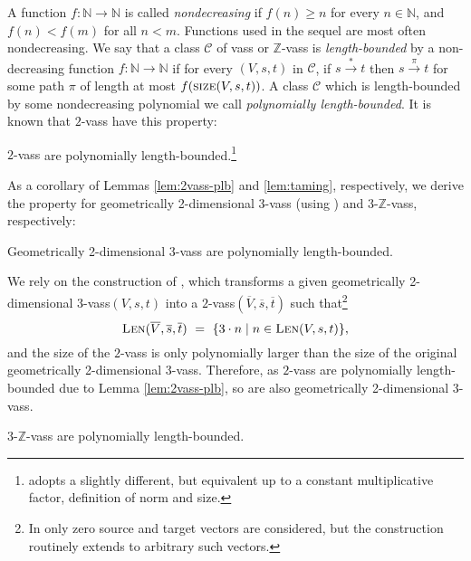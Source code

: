 \documentclass[a4paper, UKenglish, cleveref, autoref, thm-restate]{lipics-v2021}
\newcommand{\C}{\mathcal{C}}
\newcommand{\N}{\mathbb{N}}
\newcommand{\Z}{\mathbb{Z}}
\newcommand{\trans}[1]{\stackrel{#1}{\longrightarrow}}
\newcommand{\tran}{\trans{*}}
\newcommand{\size}{\textsc{size}}
\newcommand{\lb}{length-bounded\xspace}
\newcommand{\plb}{polynomially length-bounded\xspace}
\newcommand{\Len}[3]{\textsc{Len}(#1, #2, #3)}
\newcommand{\vass}{{\sc vass}\xspace}
\newcommand{\zvass}{$\Z$-{\sc vass}\xspace}
\newcommand{\dvass}{\parvass 2}
\newcommand{\tvass}{\parvass 3}
\newcommand{\geomvass}{geometrically 2-dimensional \tvass}
\newcommand{\Geomvass}{Geometrically 2-dimensional \tvass}
\newcommand{\tzvass}{\parzvass 3}
\newcommand{\parvass}[1]{{$#1$-\vass}\xspace}
\newcommand{\parzvass}[1]{{$#1$-$\Z$-\vass}\xspace}
\renewcommand{\C}{\mathcal{C}}
\newcommand{\essdvass}[1]{\overline{#1}}
\begin{document}
A function $f:\N\to\N$ is called \emph{nondecreasing} if $f(n) \geq n$ for every $n \in \N$,
and $f(n)< f(m)$ for all $n<m$.
Functions used in the sequel are most often nondecreasing.
We say that a class $\C$ of \vass or \zvass is \emph{\lb} by a 
non-decreasing function $f:\N\to\N$ if 
for every $(V, s, t)$ in $\C$, if $s \tran t$ then 
$s \trans{\pi} t$ for some path $\pi$ of length at most $f(\size(V, s, t))$.
A class $\C$ which is \lb  by some nondecreasing
polynomial we call \emph{\plb}.
It is known that \dvass  have this property:
\begin{lemma}\label{lem:2vass-plb}
\dvass are \plb.\footnote{\cite{DBLP:journals/jacm/BlondinEFGHLMT21} adopts a slightly different, but equivalent
up to a constant multiplicative factor, definition of norm and 
size.
}
\end{lemma}
As a corollary of Lemmas \ref{lem:2vass-plb} and \ref{lem:taming}, respectively,
we derive the property for \geomvass 
(using \cite[Lemma 5.1]{Zhang-geom}) and \tzvass, respectively:
\begin{lemma}\label{lem:geom-plb}
\Geomvass are \plb.
\end{lemma}
\begin{appendixproof}
We rely on the construction of \cite[Lemma 5.1]{Zhang-geom}, which transforms a given 
\geomvass $(V, s, t)$ into a \dvass $(\essdvass V, \essdvass s, \essdvass t)$ such that\footnote{
In \cite{Zhang-geom} only zero source and target vectors are considered, but the construction
routinely extends to arbitrary such vectors. 
}
\[
\Len {\essdvass V} {\essdvass s} {\essdvass t} \ = \ \{3 \cdot n \mid n \in \Len V s t\},
\]
and the size of the \dvass is only polynomially larger than the size of the original \geomvass. 
Therefore, as \dvass are \plb due to Lemma \ref{lem:2vass-plb}, so are also \geomvass.
\end{appendixproof}
\begin{lemma} \label{lem:zvass-plb}
\tzvass are \plb.
\end{lemma}
\end{document}
